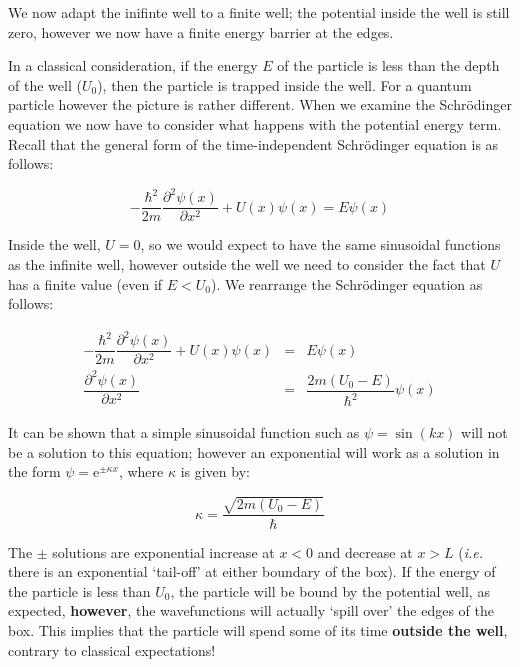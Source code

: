 \documentclass[
]{book}
\begin{document}
We now adapt the inifinte well to a finite well; the potential inside the well is still zero, however we now have a finite energy barrier at the edges.

In a classical consideration, if the energy \(E\) of the particle is less than the depth of the well (\(U_0\)), then the particle is trapped inside the well. For a quantum particle however the picture is rather different. When we examine the Schrödinger equation we now have to consider what happens with the potential energy term. Recall that the general form of the time-independent Schrödinger equation is as follows:

\begin{equation}
-\frac{\hbar^2}{2m} \frac{\partial^2 \psi(x)}{\partial x^2} + U(x) \psi(x) =  E \psi(x)
\end{equation}

Inside the well, \(U = 0\), so we would expect to have the same sinusoidal functions as the infinite well, however outside the well we need to consider the fact that \(U\) has a finite value (even if \(E<U_0\)). We rearrange the Schrödinger equation as follows:

\begin{equation}
\begin{array}{rcl}
-\dfrac{\hbar^2}{2m} \dfrac{\partial^2 \psi(x)}{\partial x^2} + U(x) \psi(x) &=&  E \psi(x)\\
\dfrac{\partial^2 \psi(x)}{\partial x^2} &=& \dfrac{2m (U_0 - E)}{\hbar^2} \psi(x)
\end{array}
\label{eq:ch18-finitewell1}
\end{equation}

It can be shown that a simple sinusoidal function such as \(\psi = \sin(kx)\) will not be a solution to this equation; however an exponential will work as a solution in the form \(\psi = \mathrm{e}^{\pm \kappa x}\), where \(\kappa\) is given by:

\begin{equation}
\kappa = \frac{\sqrt{2m(U_0 - E)}}{\hbar}
\end{equation}

The \(\pm\) solutions are exponential increase at \(x<0\) and decrease at \(x>L\) (\emph{i.e.} there is an exponential `tail-off' at either boundary of the box). If the energy of the particle is less than \(U_0\), the particle will be bound by the potential well, as expected, \textbf{however}, the wavefunctions will actually `spill over' the edges of the box. This implies that the particle will spend some of its time \textbf{outside the well}, contrary to classical expectations!
\end{document}
